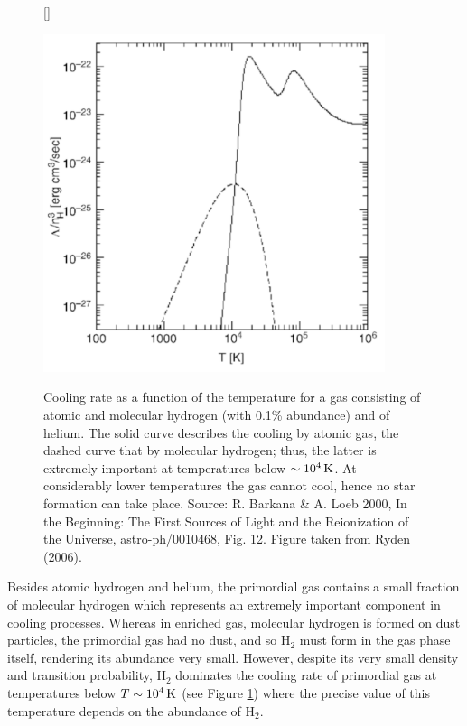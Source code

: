 \documentclass[a4paper,11pt]{article}
\begin{document}
\begin{figure}[t]
    [\FBwidth]
    {\caption{\footnotesize{Cooling rate as a function of the temperature for a gas consisting of atomic and molecular hydrogen (with 0.1\% abundance) and of helium. The solid curve describes the cooling by atomic gas, the dashed curve that by molecular hydrogen; thus, the latter is extremely important at temperatures below $\sim10^4\,{\rm K}$. At considerably lower temperatures the gas cannot cool, hence no star formation can take place. Source: R. Barkana \& A. Loeb 2000, In the Beginning: The First Sources of Light and the Reionization of the Universe, astro-ph/0010468, Fig. 12. Figure taken from Ryden (2006).}}
    \label{fig:coolingfunctionhydrogen}}
    {\includegraphics[width=10cm]{figures/CoolingFunctionHydrogen.png}}
\end{figure}

{\noindent}Besides atomic hydrogen and helium, the primordial gas contains a small fraction of molecular hydrogen which represents an extremely important component in cooling processes. Whereas in enriched gas, molecular hydrogen is formed on dust particles, the primordial gas had no dust, and so H$_2$ must form in the gas phase itself, rendering its abundance very small. However, despite its very small density and transition probability, H$_2$ dominates the cooling rate of primordial gas at temperatures below $T\sim10^4\,{\rm K}$ (see Figure \ref{fig:coolingfunctionhydrogen}) where the precise value of this temperature depends on the abundance of H$_2$.
\end{document}
